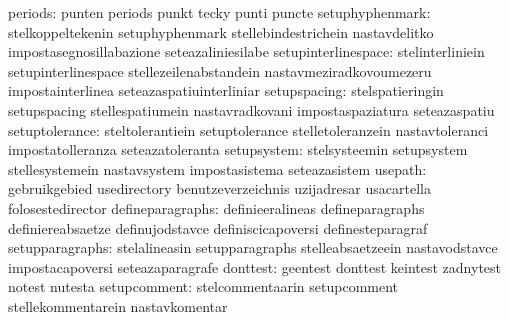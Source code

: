                          periods: punten                           periods
                                  punkt                            tecky
                                  punti                            puncte
                 setuphyphenmark: stelkoppeltekenin                setuphyphenmark
                                  stellebindestrichein             nastavdelitko
                                  impostasegnosillabazione         seteazaliniesilabe %
             setupinterlinespace: stelinterliniein                 setupinterlinespace
                                  stellezeilenabstandein           nastavmeziradkovoumezeru
                                  impostainterlinea                seteazaspatiuinterliniar
                    setupspacing: stelspatieringin                 setupspacing
                                  stellespatiumein                 nastavradkovani
                                  impostaspaziatura                seteazaspatiu
                  setuptolerance: steltolerantiein                 setuptolerance
                                  stelletoleranzein                nastavtoleranci
                                  impostatolleranza                seteazatoleranta
                     setupsystem: stelsysteemin                    setupsystem
                                  stellesystemein                  nastavsystem
                                  impostasistema                   seteazasistem
                         usepath: gebruikgebied                    usedirectory
                                  benutzeverzeichnis               uzijadresar %
                                  usacartella                      folosestedirector %
                defineparagraphs: definieeralineas                 defineparagraphs
                                  definiereabsaetze                definujodstavce
                                  definiscicapoversi               definesteparagraf
                 setupparagraphs: stelalineasin                    setupparagraphs
                                  stelleabsaetzeein                nastavodstavce
                                  impostacapoversi                 seteazaparagrafe
                        donttest: geentest                         donttest
                                  keintest                         zadnytest
                                  notest                           nutesta
                    setupcomment: stelcommentaarin                 setupcomment
                                  stellekommentarein               nastavkomentar
